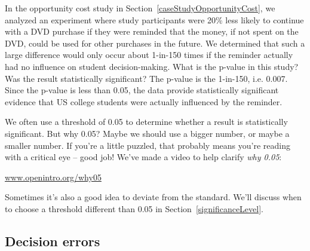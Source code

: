 
\begin{example}{In the opportunity cost study in Section~\ref{caseStudyOpportunityCost}, we analyzed an experiment where study participants were 20\% less likely to continue with a DVD purchase if they were reminded that the money, if not spent on the DVD, could be used for other purchases in the future. We determined that such a large difference would only occur about 1-in-150 times if the reminder actually had no influence on student decision-making. What is the p-value in this study? Was the result statistically significant?}
The p-value is the 1-in-150, i.e. 0.007. Since the p-value is less than 0.05, the data provide statistically significant evidence that US college students were actually influenced by the reminder.
\end{example}

\begin{termBox}{
We often use a threshold of 0.05 to determine whether a result is statistically significant. But why 0.05? Maybe we should use a bigger number, or maybe a smaller number. If you're a little puzzled, that probably means you're reading with a critical eye -- good job! We've made a video to help clarify \emph{why 0.05}:
\begin{center}
\href{http://www.openintro.org/why05}{www.openintro.org/why05}
\end{center}
Sometimes it's also a good idea to deviate from the standard. We'll discuss when to choose a threshold different than 0.05 in Section~\ref{significanceLevel}.\vspace{0.5mm}}
\end{termBox}





\subsection{Decision errors}

